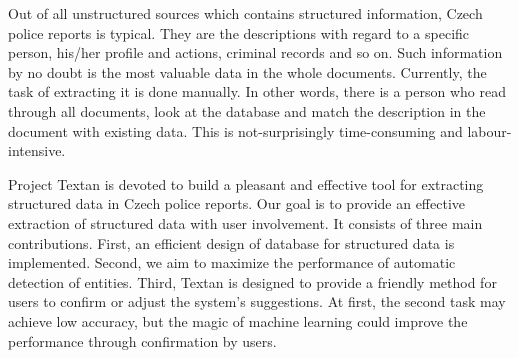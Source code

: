 Out of all unstructured sources which contains structured information, Czech police reports is typical. They are the descriptions
with regard to a specific person, his/her profile and actions, criminal records and so on. Such information by no doubt is the most
valuable data in the whole documents. Currently, the task of extracting
it is done manually. In other words, there is a person who read through all documents, look at the database and match the
description in the document with existing data. This is not-surprisingly time-consuming and labour-intensive. 

Project Textan is devoted to build a pleasant and effective tool for extracting structured data in Czech police reports. 
Our goal is to provide an effective extraction of structured data with user involvement. It consists of three main contributions.
First, an efficient design of database for structured data is implemented. Second, we aim to maximize the performance of 
automatic detection of entities. Third, Textan is designed to provide a friendly method for users to confirm or adjust 
the system's suggestions. %
At first, the second task may achieve low accuracy, but the magic of machine learning could improve the performance through 
confirmation by users. 






















